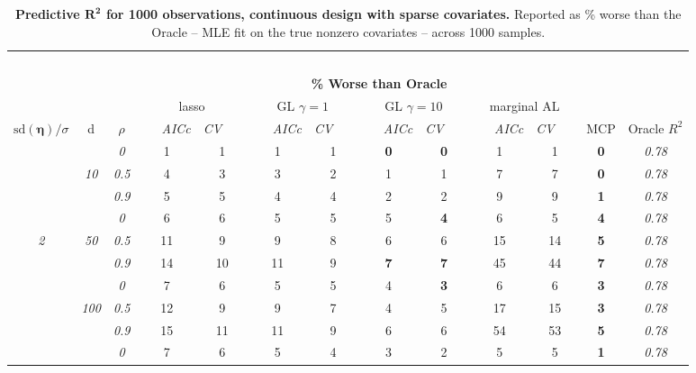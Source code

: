 \clearpage
\begin{table}
\vspace{-.2cm}
\footnotesize
\caption{ 
	{\bf  Predictive $\boldsymbol{R^2}$ for 1000 observations, 
	continuous design with sparse covariates.}
  Reported as  \% worse than the Oracle 
  -- MLE fit on the true nonzero covariates -- 
  across 1000 samples.}
\begin{center}
\begin{tabular}{ccc|cc|cc|cc|cc|c|c}
\hline &&&\multicolumn{9}{|c|}{~}\\[-1ex]
\multicolumn{3}{c}{~}&\multicolumn{9}{|c|}{\bf \% Worse than Oracle } &   \\[1ex]
& &
& \multicolumn{2}{c}{lasso} 
& \multicolumn{2}{c}{GL $\gamma=1$} 
& \multicolumn{2}{c}{GL $\gamma=10$} 
& \multicolumn{2}{c}{marginal AL} 
& \multicolumn{1}{c|}{~} & \\[-0.5ex]
$\mathrm{sd}(\boldsymbol{\eta})/\sigma$ & {\sf d} & $\rho$ 
& ~~~\scriptsize\it AICc & \multicolumn{1}{c}{\scriptsize\it CV~~~}
& ~~~\scriptsize\it AICc & \multicolumn{1}{c}{\scriptsize\it CV~~~}
& ~~~\scriptsize\it AICc & \multicolumn{1}{c}{\scriptsize\it CV~~~}
& ~~~\scriptsize\it AICc & \multicolumn{1}{c}{\scriptsize\it CV~~~} 
& \multicolumn{1}{c|}{ MCP} & Oracle $R^2$ \\[.5ex]
\hline\rule{0pt}{3ex}
& & \it  0  & 1 & 1 & 1 & 1 & {\bf 0} & {\bf 0} & 1 & 1 & {\bf 0} & \it  0.78 \\
 & \it  10  & \it  0.5  & 4 & 3 & 3 & 2 & 1 & 1 & 7 & 7 & {\bf 0} & \it  0.78 \\
& & \it  0.9  & 5 & 5 & 4 & 4 & 2 & 2 & 9 & 9 & {\bf 1} & \it  0.78 \\[1ex]
\cline{2-3}\rule{0pt}{3ex}
& & \it  0  & 6 & 6 & 5 & 5 & 5 & {\bf 4} & 6 & 5 & {\bf 4} & \it  0.78 \\
\it  2  & \it  50  & \it  0.5  & 11 & 9 & 9 & 8 & 6 & 6 & 15 & 14 & {\bf 5} & \it  0.78 \\
& & \it  0.9  & 14 & 10 & 11 & 9 & {\bf 7} & {\bf 7} & 45 & 44 & {\bf 7} & \it  0.78 \\[1ex]
\cline{2-3}\rule{0pt}{3ex}
& & \it  0  & 7 & 6 & 5 & 5 & 4 & {\bf 3} & 6 & 6 & {\bf 3} & \it  0.78 \\
 & \it  100  & \it  0.5  & 12 & 9 & 9 & 7 & 4 & 5 & 17 & 15 & {\bf 3} & \it  0.78 \\
& & \it  0.9  & 15 & 11 & 11 & 9 & 6 & 6 & 54 & 53 & {\bf 5} & \it  0.78 \\[1ex]
\cline{2-3}\rule{0pt}{3ex}
& & \it  0  & 7 & 6 & 5 & 4 & 3 & 2 & 5 & 5 & {\bf 1} & \it  0.78 \\

\end{tabular}
\end{center}
\end{table}
